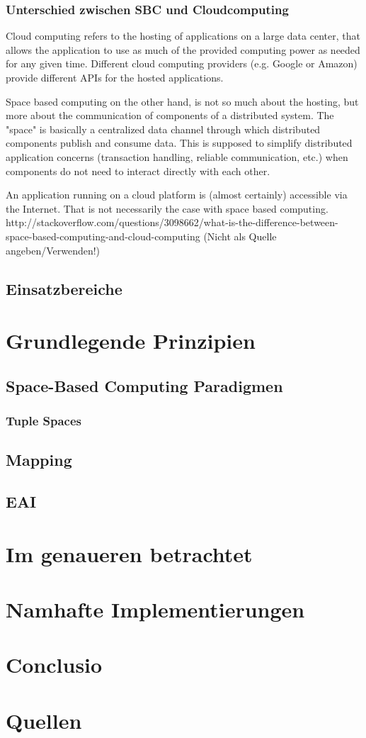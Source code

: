 \documentclass[a4paper,12pt]{scrreprt}
\begin{document}
		
		\subsection{Unterschied zwischen SBC und Cloudcomputing}
			Cloud computing refers to the hosting of applications on a large data center, that allows the application to use as much of the provided computing power as needed for any given time. Different cloud computing providers (e.g. Google or Amazon) provide different APIs for the hosted applications.
			
			Space based computing on the other hand, is not so much about the hosting, but more about the communication of components of a distributed system. The "space" is basically a centralized data channel through which distributed components publish and consume data. This is supposed to simplify distributed application concerns (transaction handling, reliable communication, etc.) when components do not need to interact directly with each other.
			
			An application running on a cloud platform is (almost certainly) accessible via the Internet. That is not necessarily the case with space based computing.
			http://stackoverflow.com/questions/3098662/what-is-the-difference-between-space-based-computing-and-cloud-computing
			(Nicht als Quelle angeben/Verwenden!)
			
	\section{Einsatzbereiche}
		
\chapter{Grundlegende Prinzipien}
	\section{Space-Based Computing Paradigmen}
		\subsection{Tuple Spaces}
			
		
	\section{Mapping}
		
	\section{EAI}
		
\chapter{Im genaueren betrachtet}
	
\chapter{Namhafte Implementierungen}
	
\chapter{Conclusio}

\chapter{Quellen}
\end{document}
